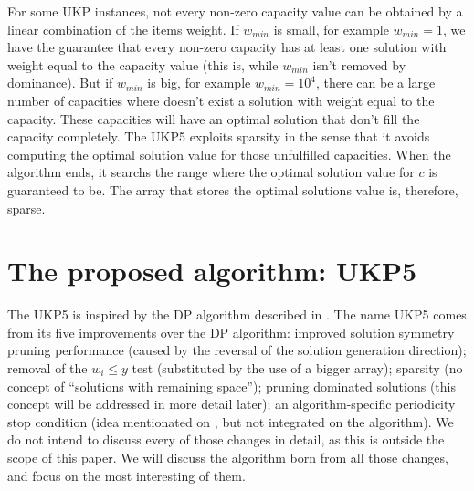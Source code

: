 \documentclass[runningheads,a4paper]{llncs}
\begin{document}
For some UKP instances, not every non-zero capacity value can be obtained by a linear combination of the items weight. If \(w_{min}\) is small, for example \(w_{min} = 1\), we have the guarantee that every non-zero capacity has at least one solution with weight equal to the capacity value (this is, while \(w_{min}\) isn't removed by dominance). But if \(w_{min}\) is big, for example \(w_{min} = 10^4\), there can be a large number of capacities where doesn't exist a solution with weight equal to the capacity. These capacities will have an optimal solution that don't fill the capacity completely. The UKP5 exploits sparsity in the sense that it avoids computing the optimal solution value for those unfulfilled capacities. When the algorithm ends, it searchs the range where the optimal solution value for \(c\) is guaranteed to be. The array that stores the optimal solutions value is, therefore, sparse.

\section{The proposed algorithm: UKP5}

The UKP5 is inspired by the DP algorithm described in \cite[p. 221]{gar72}. The name UKP5 comes from its five improvements over the \cite{gar72} DP algorithm: improved solution symmetry pruning performance (caused by the reversal of the solution generation direction); removal of the \(w_i \leq y\) test (substituted by the use of a bigger array); sparsity (no concept of ``solutions with remaining space''); pruning dominated solutions (this concept will be addressed in more detail later); an algorithm-specific periodicity stop condition (idea mentionated on \cite{gar72}, but not integrated on the algorithm). We do not intend to discuss every of those changes in detail, as this is outside the scope of this paper. We will discuss the algorithm born from all those changes, and focus on the most interesting of them.
\end{document}
